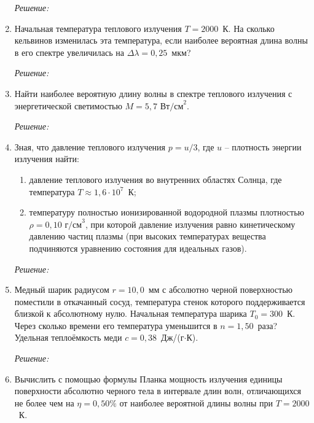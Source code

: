 \begin{enumerate}
\emph{Решение:}

\newpage

\item Начальная температура теплового излучения \( T = 2000 \)~К. На сколько
кельвинов изменилась эта температура, если наиболее вероятная длина волны в его
спектре увеличилась на \( \Delta\lambda = 0,\!25 \)~мкм?

\emph{Решение:}

\newpage

\item Найти наиболее вероятную длину волны в спектре теплового излучения с
энергетической светимостью \( M = 5,\!7\text{~Вт/см}^2 \).

\emph{Решение:}

\newpage

\item Зная, что давление теплового излучения \( p = u/3 \), где \( u \) --
плотность энергии излучения найти:
\begin{enumerate}
    \item давление теплового излучения во внутренних областях Солнца, где
    температура \( T \approx 1,6\cdot 10^7 \)~К;
    \item температуру полностью ионизированной водородной плазмы плотностью
    \( \rho = 0,\!10\text{~г/см}^3 \), при которой давление излучения равно
    кинетическому давлению частиц плазмы (при высоких температурах вещества
    подчиняются уравнению состояния для идеальных газов).
\end{enumerate}

\emph{Решение:}

\newpage

\item Медный шарик радиусом \( r = 10,\!0 \)~мм с абсолютно черной поверхностью
поместили в откачанный сосуд, температура стенок которого поддерживается близкой
к абсолютному нулю. Начальная температура шарика \( T_0 = 300 \)~К. Через
сколько времени его температура уменьшится в \( n = 1,\!50 \)~раза? Удельная
теплоёмкость меди \( c = 0,38 \)~Дж/(г\( \cdot \)К).

\emph{Решение:}

\newpage

\item Вычислить с помощью формулы Планка мощность излучения единицы поверхности
абсолютно черного тела в интервале длин волн, отличающихся не более чем на
\( \eta = 0,\!50\% \) от наиболее вероятной длины волны при \( T = 2000 \)~К.


\end{enumerate}
